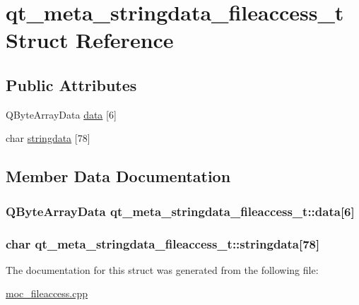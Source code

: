 \hypertarget{structqt__meta__stringdata__fileaccess__t}{\section{qt\-\_\-meta\-\_\-stringdata\-\_\-fileaccess\-\_\-t Struct Reference}
\label{structqt__meta__stringdata__fileaccess__t}
}
\subsection*{Public Attributes}
\begin{DoxyCompactItemize}
\item 
Q\-Byte\-Array\-Data \hyperlink{structqt__meta__stringdata__fileaccess__t_ad4dd550c419d471bc7227dec86c9dc22}{data} \mbox{[}6\mbox{]}
\item 
char \hyperlink{structqt__meta__stringdata__fileaccess__t_a911d2d8fb26de29c9dbf67228662906e}{stringdata} \mbox{[}78\mbox{]}
\end{DoxyCompactItemize}


\subsection{Member Data Documentation}
\hypertarget{structqt__meta__stringdata__fileaccess__t_ad4dd550c419d471bc7227dec86c9dc22}{
\subsubsection[{data}]{\setlength{\rightskip}{0pt plus 5cm}Q\-Byte\-Array\-Data qt\-\_\-meta\-\_\-stringdata\-\_\-fileaccess\-\_\-t\-::data\mbox{[}6\mbox{]}}}\label{structqt__meta__stringdata__fileaccess__t_ad4dd550c419d471bc7227dec86c9dc22}
\hypertarget{structqt__meta__stringdata__fileaccess__t_a911d2d8fb26de29c9dbf67228662906e}{
\subsubsection[{stringdata}]{\setlength{\rightskip}{0pt plus 5cm}char qt\-\_\-meta\-\_\-stringdata\-\_\-fileaccess\-\_\-t\-::stringdata\mbox{[}78\mbox{]}}}\label{structqt__meta__stringdata__fileaccess__t_a911d2d8fb26de29c9dbf67228662906e}


The documentation for this struct was generated from the following file\-:\begin{DoxyCompactItemize}
\item 
\hyperlink{moc__fileaccess_8cpp}{moc\-\_\-fileaccess.\-cpp}\end{DoxyCompactItemize}
